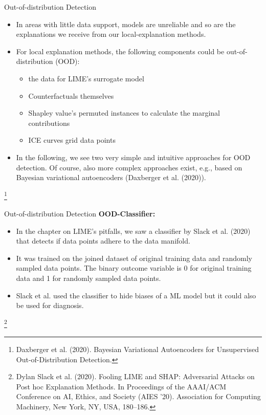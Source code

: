 \documentclass[11pt,compress,t,notes=noshow, aspectratio=169, xcolor=table]{beamer}
\begin{document}
\begin{vbframe}{Out-of-distribution Detection}
	\begin{itemize}
		\item In areas with little data support, models are unreliable and so are the explanations we receive from our local-explanation methods.
		\item For local explanation methods, the following components could be out-of-distribution (OOD): 
		\begin{itemize}
			\item the data for LIME's surrogate model
			\item Counterfactuals themselves
			\item Shapley value's permuted instances to calculate the marginal contributions 
			\item ICE curves grid data points 
		\end{itemize}
		\item In the following, we see two very simple and intuitive approaches for OOD detection. Of course, also more complex approaches exist, e.g., based on Bayesian variational autoencoders (Daxberger et al. (2020)).
	\end{itemize}
\footnote[frame]{Daxberger et al. (2020). Bayesian Variational Autoencoders for Unsupervised Out-of-Distribution Detection.}
\end{vbframe}


\begin{vbframe}{Out-of-distribution Detection}
	\textbf{OOD-Classifier:} 
	\begin{itemize}
		\item In the chapter on LIME's pitfalls, we saw a classifier by Slack et al. (2020) that detects if data points adhere to the data manifold. 
		\item It was trained on the joined dataset of original training data and randomly sampled data points. 
		The binary outcome variable is 0 for original training data and 1 for randomly sampled data points. 
		\item Slack et al. used the classifier to hide biases of a ML model but it could also be used for diagnosis.  
	\end{itemize}
	\footnote[frame]{Dylan Slack et al. (2020). Fooling LIME and SHAP: Adversarial Attacks on Post hoc Explanation Methods. In Proceedings of the AAAI/ACM Conference on AI, Ethics, and Society (AIES '20). Association for Computing Machinery, New York, NY, USA, 180–186.}
\end{vbframe}
\end{document}
